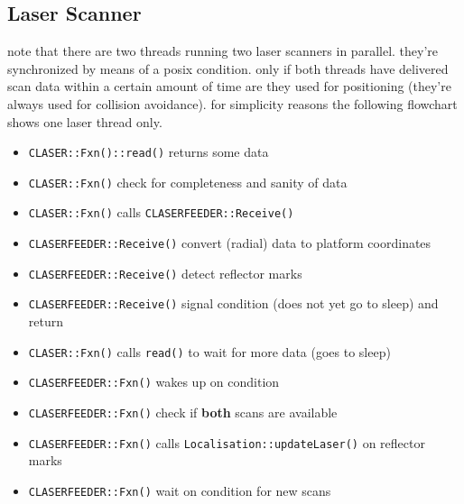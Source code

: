 \documentclass{article}
\begin{document}
\subsection{Laser Scanner}

note that there are two threads running two laser scanners in parallel. they're
synchronized by means of a posix condition. only if both threads have delivered
scan data within a certain amount of time are they used for positioning
(they're always used for collision avoidance).  for simplicity reasons the
following flowchart shows one laser thread only.

\begin{itemize}\itemsep0ex
\item \texttt{CLASER::Fxn()::read()} returns some data
\item \texttt{CLASER::Fxn()} check for completeness and sanity of data
\item \texttt{CLASER::Fxn()} calls \texttt{CLASERFEEDER::Receive()}
\item \texttt{CLASERFEEDER::Receive()} convert (radial) data to platform coordinates
\item \texttt{CLASERFEEDER::Receive()} detect reflector marks
\item \texttt{CLASERFEEDER::Receive()} signal condition (does not yet go to
sleep) and return
\item \texttt{CLASER::Fxn()} calls \texttt{read()} to wait for more data (goes
to sleep)
\item \texttt{CLASERFEEDER::Fxn()} wakes up on condition
\item \texttt{CLASERFEEDER::Fxn()} check if \textbf{both} scans are available
\item \texttt{CLASERFEEDER::Fxn()} calls \texttt{Localisation::updateLaser()}
on reflector marks
\item \texttt{CLASERFEEDER::Fxn()} wait on condition for new scans
\end{itemize}

\end{document}

